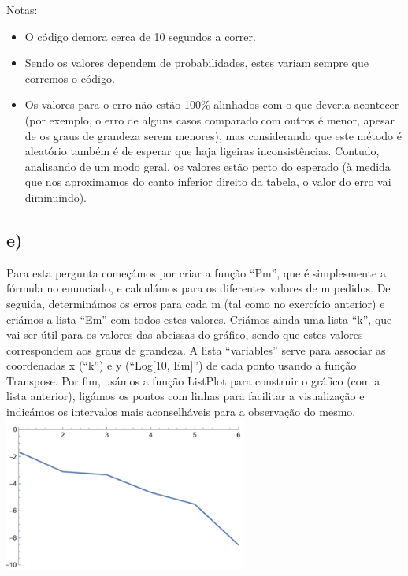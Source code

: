 \documentclass[12pt,a4paper]{article}
\begin{document}
        Notas:
        \begin{itemize}
            \item O código demora cerca de 10 segundos a correr.
            \item Sendo os valores dependem de probabilidades, estes variam sempre que corremos o código.
            \item Os valores para o erro não estão 100\% alinhados com o que deveria acontecer (por exemplo, o erro de alguns casos comparado com outros é menor, apesar de os graus de grandeza serem menores), mas considerando que este método é aleatório também é de esperar que haja ligeiras inconsistências. Contudo, analisando de um modo geral, os valores estão perto do esperado (à medida que nos aproximamos do canto inferior direito da tabela, o valor do erro vai diminuindo).
        \end{itemize}

    \subsection{e)}
        Para esta pergunta começámos por criar a função “Pm”, que é simplesmente a fórmula no enunciado, e calculámos para os diferentes valores de m pedidos. De seguida, determinámos os erros para cada m (tal como no exercício anterior) e criámos a lista “Em” com todos estes valores. Criámos ainda uma lista “k”, que vai ser útil para os valores das abcissas do gráfico, sendo que estes valores correspondem aos graus de grandeza. A lista “variables” serve para associar as coordenadas x (“k”) e y (“Log[10, Em]”) de cada ponto usando a função Transpose. Por fim, usámos a função ListPlot para construir o gráfico (com a lista anterior), ligámos os pontos com linhas para facilitar a visualização e indicámos os intervalos mais aconselháveis para a observação do mesmo. \\

        \includegraphics[width=8cm]{2_3.png} \\
        
\end{document}
